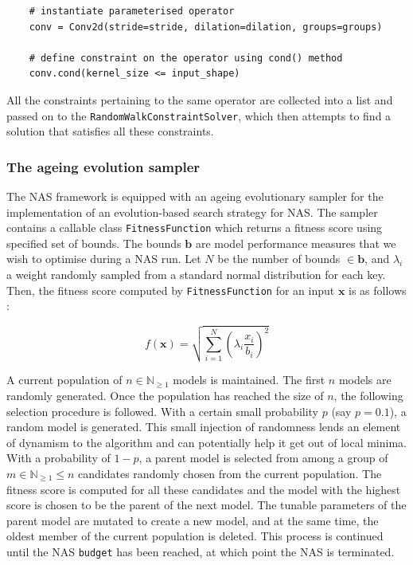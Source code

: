 \documentclass[11pt,a4paper, open=any]{scrbook}
\newcounter{constraint}[chapter]
\newcounter{algorithm}[chapter]
\newcommand{\py}[1]{\texttt{#1}}
\begin{document}
\begin{verbatim}
	# instantiate parameterised operator
	conv = Conv2d(stride=stride, dilation=dilation, groups=groups)
	
	# define constraint on the operator using cond() method 
	conv.cond(kernel_size <= input_shape)
\end{verbatim}

All the constraints pertaining to the same operator are collected into a list and passed on to the \py{RandomWalkConstraintSolver}, which then attempts to find a solution that satisfies all these constraints.

\subsubsection{The ageing evolution sampler}
The NAS framework is equipped with an ageing evolutionary sampler for the implementation of an evolution-based search strategy for NAS. The sampler contains a callable class \py{FitnessFunction} which returns a fitness score using specified set of bounds. The bounds $\mathbf{b}$ are model performance measures that we wish to optimise during a NAS run. Let $N$ be the number of bounds $\in \mathbf{b}$, and $\lambda_i$ a weight randomly sampled from a standard normal distribution for each key. Then, the fitness score computed by \py{FitnessFunction} for an input $\mathbf{x}$ is as follows \cite{reiber26}:

\begin{equation}
	f(\mathbf{x}) = 
	\sqrt{\sum_{i=1}^{N}
		\left(\lambda_i \frac{x_i}{b_i}
			\right)^2}
\end{equation}

A current population of $n \in \mathbb{N}_{\geqslant 1}$ models is maintained. The first $n$ models are randomly generated. Once the population has reached the size of $n$, the following selection procedure is followed. With a certain small probability $p$ (say $p=0.1$), a random model is generated. This small injection of randomness lends an element of dynamism to the algorithm and can potentially help it get out of local minima. With a probability of $1-p$, a parent model is selected from among a group of $m\in \mathbb{N}_{\geqslant 1} \leqslant n$ candidates randomly chosen from the current population. The fitness score is computed for all these candidates and the model with the highest score is chosen to be the parent of the next model. The tunable parameters of the parent model are mutated to create a new model, and at the same time, the oldest member of the current population is deleted. This process is continued until the NAS \texttt{budget} has been reached, at which point the NAS is terminated.
\end{document}
